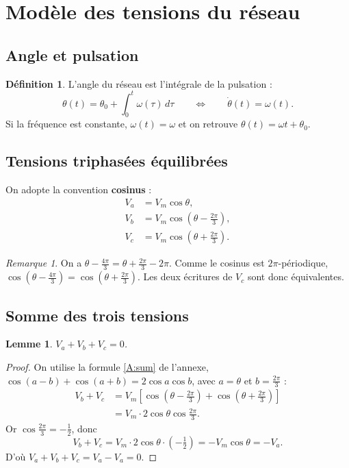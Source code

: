 \documentclass[11pt,a4paper]{article}
\numberwithin{equation}{section}
\theoremstyle{plain}
\newtheorem{lemme}[theoreme]{Lemme}
\theoremstyle{definition}
\newtheorem{definition}[theoreme]{Définition}
\theoremstyle{remark}
\newtheorem{remarque}[theoreme]{Remarque}
\begin{document}
\section{Modèle des tensions du réseau}

\subsection{Angle et pulsation}
\begin{definition}
L'angle du réseau est l'intégrale de la pulsation :
\begin{equation}\label{eq:theta}
\theta(t) = \theta_0 + \int_0^t \omega(\tau)\,d\tau
\qquad\Longleftrightarrow\qquad
\boxed{\dot\theta(t) = \omega(t).}
\end{equation}
Si la fréquence est constante, $\omega(t)=\omega$ et on retrouve $\theta(t)=\omega t+\theta_0$.
\end{definition}

\subsection{Tensions triphasées équilibrées}
On adopte la convention \textbf{cosinus} :
\begin{align}
V_a &= V_m\cos\theta, \label{eq:va}\\
V_b &= V_m\cos\!\left(\theta-\tfrac{2\pi}{3}\right), \label{eq:vb}\\
V_c &= V_m\cos\!\left(\theta+\tfrac{2\pi}{3}\right). \label{eq:vc}
\end{align}
\begin{remarque}
On a $\theta-\tfrac{4\pi}{3} = \theta+\tfrac{2\pi}{3}-2\pi$. Comme le cosinus est $2\pi$-périodique,
$\cos(\theta-\tfrac{4\pi}{3})=\cos(\theta+\tfrac{2\pi}{3})$. Les deux écritures de $V_c$ sont donc équivalentes.
\end{remarque}

\subsection{Somme des trois tensions}
\begin{lemme}\label{lem:somme}
$V_a+V_b+V_c = 0$.
\end{lemme}
\begin{proof}
On utilise la formule \eqref{A:sum} de l'annexe, $\cos(a-b)+\cos(a+b)=2\cos a\cos b$,
avec $a=\theta$ et $b=\tfrac{2\pi}{3}$ :
\begin{align}
V_b+V_c &= V_m\left[\cos\!\left(\theta-\tfrac{2\pi}{3}\right)+\cos\!\left(\theta+\tfrac{2\pi}{3}\right)\right]\\
&= V_m\cdot 2\cos\theta\cos\tfrac{2\pi}{3}.
\end{align}
Or $\cos\tfrac{2\pi}{3} = -\tfrac12$, donc
\begin{equation}\label{eq:vbpvc}
V_b+V_c = V_m\cdot 2\cos\theta\cdot\left(-\tfrac12\right) = -V_m\cos\theta = -V_a .
\end{equation}
D'où $V_a+V_b+V_c = V_a - V_a = 0$.
\end{proof}
\end{document}
